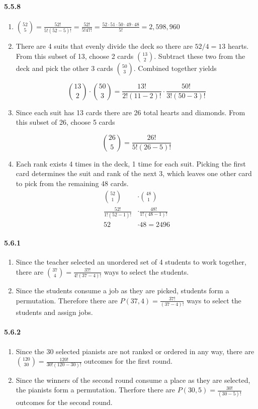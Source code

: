 \documentclass[11pt, letterpaper, twocolumn, fleqn]{article}
\begin{document}
\paragraph{5.5.8}
\begin{enumerate}
  \item $\binom{52}{5} = \frac{52!}{5!(52-5)!} = \frac{52!}{5!47!} = \frac{52 \cdot 51 \cdot 50 \cdot 49 \cdot 48}{5!} = 2,598,960$
  \item There are 4 suits that evenly divide the deck so there are $52/4 = 13$ hearts. From this subset of 13, choose 2 cards $\binom{13}{2}$. Subtract these two from the deck and pick the other 3 cards $\binom{50}{3}$. Combined together yields 
  
    $$\binom{13}{2} \cdot \binom{50}{3} = \frac{13!}{2!(11-2)!} \cdot \frac{50!}{3!(50-3)!}$$
    
  \item Since each suit has 13 cards there are 26 total hearts and diamonds. From this subset of 26, choose 5 cards 
  
    $$\binom{26}{5} = \frac{26!}{5!(26-5)!}$$
    
  \item Each rank exists 4 times in the deck, 1 time for each suit. Picking the first card determines the suit and rank of the next 3, which leaves one other card to pick from the remaining 48 cards.
    \begin{align*}
      \binom{52}{1} &\cdot \binom{48}{1} \\
      \frac{52!}{1!(52-1)!} &\cdot \frac{48!}{1!(48-1)!} \\
      52 &\cdot 48 = 2496 
    \end{align*}
\end{enumerate}

\paragraph{5.6.1}
\begin{enumerate}
  \item Since the teacher selected an unordered set of 4 students to work together, there are $\binom{37}{4} = \frac{37!}{4!(37-4)!}$ ways to select the students.
  \item Since the students consume a job as they are picked, students form a permutation. Therefore there are $P(37,4) = \frac{37!}{(37-4)!}$ ways to select the students and assign jobs.
\end{enumerate}

\paragraph{5.6.2}
\begin{enumerate}
  \item Since the 30 selected pianists are not ranked or ordered in any way, there are $\binom{120}{30} = \frac{120!}{30!(120-30)!}$ outcomes for the first round.
  \item Since the winners of the second round consume a place as they are selected, the pianists form a permutation. Therfore there are $P(30,5) = \frac{30!}{(30-5)!}$ outcomes for the second round.
\end{enumerate}
\end{document}
